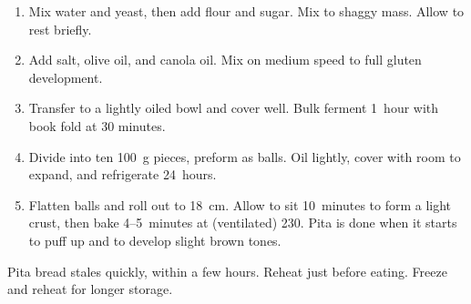 \label{pita}

\begin{ingredients}
\end{ingredients}


\begin{recipe}
  \begin{enumerate}

  \item Mix water and yeast, then add flour and sugar.  Mix to shaggy
    mass.  Allow to rest briefly.

  \item Add salt, olive oil, and canola oil.  Mix on medium speed to
    full gluten development.

  \item Transfer to a lightly oiled bowl and cover well.  Bulk ferment
    1~hour with book fold at 30 minutes.

  \item Divide into ten 100~g pieces, preform as balls.  Oil lightly,
    cover with room to expand, and refrigerate 24~hours.

  \item Flatten balls and roll out to 18~cm.  Allow to sit 10~minutes
    to form a light crust, then bake 4\fracH--5~minutes at (ventilated)
    230\degreeC.  Pita is done when it starts to puff up and to
    develop slight brown tones.

  \end{enumerate}
\end{recipe}

Pita bread stales quickly, within a few hours.  Reheat just before
eating.  Freeze and reheat for longer storage.

